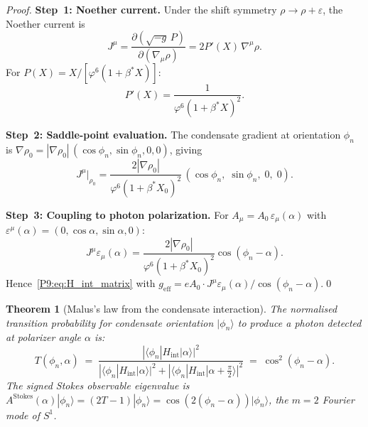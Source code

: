 \documentclass[11pt,a4paper]{article}
\newtheorem{theorem}{Theorem}[section]
\theoremstyle{definition}
\theoremstyle{remark}
\newcommand{\vp}{\varphi}
\newcommand{\bst}{\beta^{*}}
\begin{document}
\begin{proof}
\textbf{Step~1: Noether current.}
Under the shift symmetry $\rho\to\rho+\varepsilon$, the Noether current is
\begin{equation}
  J^\mu
  = \frac{\partial(\sqrt{-g}\,P)}{\partial(\nabla_\mu\rho)}
  = 2P'(X)\,\nabla^\mu\rho.
  \label{P9:eq:J_Noether}
\end{equation}
For $P(X)=X/[\vp^6(1+\bst X)]$:
\begin{equation}
  P'(X)
  = \frac{1}{\vp^6(1+\bst X)^2}.
  \label{P9:eq:Pprime}
\end{equation}

\textbf{Step~2: Saddle-point evaluation.}
The condensate gradient at orientation $\phi_n$ is
$\nabla\rho_0 = |\nabla\rho_0|\,(\cos\phi_n,\sin\phi_n,0,0)$, giving
\begin{equation}
  J^\mu\big|_{\rho_0}
  = \frac{2|\nabla\rho_0|}{\vp^6(1+\bst X_0)^2}\,
  (\cos\phi_n,\;\sin\phi_n,\;0,\;0).
  \label{P9:eq:J_saddle}
\end{equation}

\textbf{Step~3: Coupling to photon polarization.}
For $A_\mu = A_0\,\varepsilon_\mu(\alpha)$ with
$\varepsilon^\mu(\alpha)=(0,\cos\alpha,\sin\alpha,0)$:
\begin{equation}
  J^\mu\varepsilon_\mu(\alpha)
  = \frac{2|\nabla\rho_0|}{\vp^6(1+\bst X_0)^2}
  \cos(\phi_n-\alpha).
  \label{P9:eq:J_eps}
\end{equation}
Hence~\eqref{P9:eq:H_int_matrix} with $g_\mathrm{eff}=eA_0\cdot J^\mu\varepsilon_\mu(\alpha)/\cos(\phi_n-\alpha)$.\qed
\end{proof}

\begin{theorem}[Malus's law from the condensate interaction]
\label{P9:thm:malus}
The normalised transition probability for condensate orientation $|\phi_n\rangle$
to produce a photon detected at polarizer angle $\alpha$ is:
\begin{equation}
  T(\phi_n,\alpha)
  \;=\; \frac{|\langle\phi_n|H_\mathrm{int}|\alpha\rangle|^2}
             {|\langle\phi_n|H_\mathrm{int}|\alpha\rangle|^2
              +|\langle\phi_n|H_\mathrm{int}|\alpha{+}\tfrac{\pi}{2}\rangle|^2}
  \;=\; \cos^2(\phi_n-\alpha).
  \label{P9:eq:malus_derived}
\end{equation}
The signed Stokes observable eigenvalue is
$A^\mathrm{Stokes}(\alpha)|\phi_n\rangle = (2T-1)|\phi_n\rangle
= \cos(2(\phi_n-\alpha))|\phi_n\rangle$,
the $m=2$ Fourier mode of $S^1$.
\end{theorem}
\end{document}
